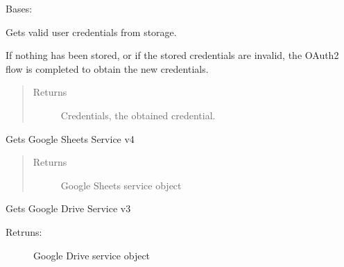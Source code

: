 \documentclass[letterpaper,10pt,english,openany]{sphinxmanual}
\begin{document}
\begin{fulllineitems}
\label{rpicameramon:rpicameramon.telemetry.GoogleHandler}
Bases: 

\begin{fulllineitems}
\label{rpicameramon:rpicameramon.telemetry.GoogleHandler.get_credentials}
Gets valid user credentials from storage.

If nothing has been stored, or if the stored credentials are invalid,
the OAuth2 flow is completed to obtain the new credentials.
\begin{quote}\begin{description}
\item[{Returns}] \leavevmode
Credentials, the obtained credential.

\end{description}\end{quote}

\end{fulllineitems}


\begin{fulllineitems}
\label{rpicameramon:rpicameramon.telemetry.GoogleHandler.get_sheets_service}
Gets Google Sheets Service v4
\begin{quote}\begin{description}
\item[{Returns}] \leavevmode
Google Sheets service object

\end{description}\end{quote}

\end{fulllineitems}


\begin{fulllineitems}
\label{rpicameramon:rpicameramon.telemetry.GoogleHandler.get_file_service}
Gets Google Drive Service v3
\begin{description}
\item[{Retruns:}] \leavevmode
Google Drive service object


\end{description}
\end{fulllineitems}
\end{fulllineitems}
\end{document}
